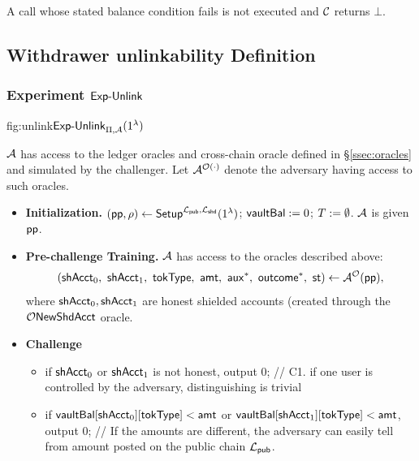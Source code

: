 \noindent A call whose stated balance condition fails is not executed and $\mathcal{C}$ returns $\bot$.


\subsection{Withdrawer unlinkability Definition}
\label{ssec:unlink}


\subsubsection{Experiment \texorpdfstring{$\mathsf{Exp\text{-}Unlink}$}{Exp-Unlink}}
\begin{ExpFig}{fig:unlink}{$\mathsf{Exp\text{-}Unlink}_{\Pi,\mathcal{A}}(1^{\lambda})$}

\vspace{10pt}
$\mathcal{A}$ has access to  the ledger oracles  and cross-chain oracle defined in \S\ref{ssec:oracles} and simulated by the challenger.
Let  $\mathcal{A}^{\mathcal{O}(\cdot)}$ denote the adversary having access to
such oracles.


\begin{itemize}[leftmargin=1.4em,itemsep=3pt]
\item \textbf{Initialization.} $(\mathsf{pp},\rho) \gets \mathsf{Setup}^{\mathcal{L}_{\mathsf{pub}},\mathcal{L}_{\mathsf{shd}}}(1^{\lambda})$; $\mathsf{vaultBal} := 0$;
      $T := \emptyset$. $\mathcal{A}$ is given $\mathsf{pp}$.
\item \textbf{Pre-challenge Training.}
$\mathcal{A}$ has access to the oracles  described above:
      \[(\candZero\bc \candOne\bc \tokType\bc \amt\bc \auxx^*\bc \outc^*\bc
      \mathsf{st}) \gets \Adv^{\mathcal{O}}(\pp),\]
      where $\mathsf{shAcct}_0, \mathsf{shAcct}_1$ are honest shielded accounts (created through the $\mathcal{O}\mathsf{NewShdAcct}$ oracle.
\item \textbf{Challenge}
  \begin{itemize}[nosep,leftmargin=1.4em]
  \item if $\mathsf{shAcct}_0$ or $\mathsf{shAcct}_1$ is not honest, output $0$; // C1. if one user is controlled by the adversary, distinguishing is trivial
  \item if $\mathsf{vaultBal}[\mathsf{shAcct}_0][\mathsf{tokType}] < \mathsf{amt}$ or $\mathsf{vaultBal}[\mathsf{shAcct}_1][\mathsf{tokType}] < \mathsf{amt}$, output $0$;
  // If the amounts are different, the adversary can easily tell from amount posted on the public chain $\mathcal{L}_{\mathsf{pub}}$.


\end{itemize}
\end{itemize}
\end{ExpFig}
